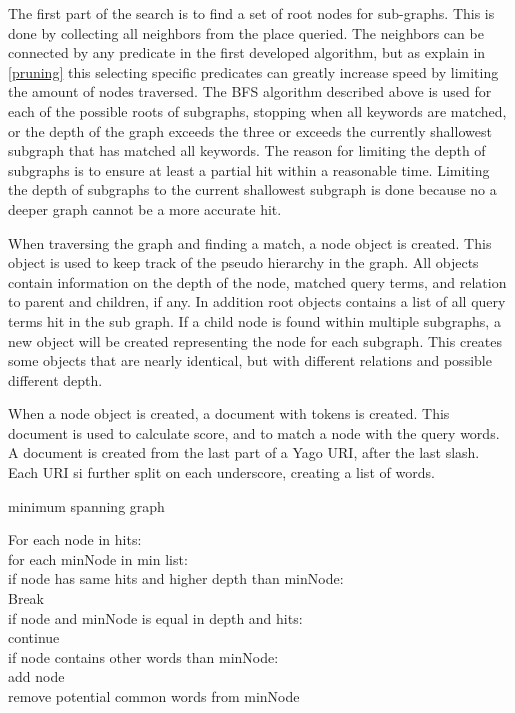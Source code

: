The first part of the search is to find a set of root nodes for sub-graphs. This is done by collecting all neighbors from the place queried. The neighbors can be connected by any predicate in the first developed algorithm, but as explain in \ref{pruning} this selecting specific predicates can greatly increase speed by limiting the amount of nodes traversed. The BFS algorithm described above is used for each of the possible roots of subgraphs, stopping when all keywords are matched, or the depth of the graph exceeds the three or exceeds the currently shallowest subgraph that has matched all keywords. The reason for limiting the depth of subgraphs is to ensure at least a partial hit within a reasonable time. Limiting the depth of subgraphs to the current shallowest subgraph is done because no a deeper graph cannot be a more accurate hit.

When traversing the graph and finding a match, a node object is created. This object is used to keep track of the pseudo hierarchy in the graph. All objects contain information on the depth of the node, matched query terms, and relation to parent and children, if any. In addition root objects contains a list of all query terms hit in the sub graph. If a child node is found within multiple subgraphs, a new object will be created representing the node for each subgraph. This creates some objects that are nearly identical, but with different relations and possible different depth.

When a node object is created, a document with tokens is created. This document is used to calculate score, and to match a node with the query words. A document is created from the last part of a Yago URI, after the last slash. Each URI si further split on each underscore, creating a list of words. 

\begin{algorithm}
\caption{minimum spanning graph}
\begin{algorithmic}[1]
For each node in hits:\\
	for each minNode in min list:\\
		if node has same hits and higher depth than minNode:\\
			Break\\
		if node and minNode is equal in depth and hits:\\
			continue\\
		if node contains other words than minNode:\\
			add node\\
			remove potential common words from minNode\\
\EndProcedure
\end{algorithmic}
\end{algorithm}


